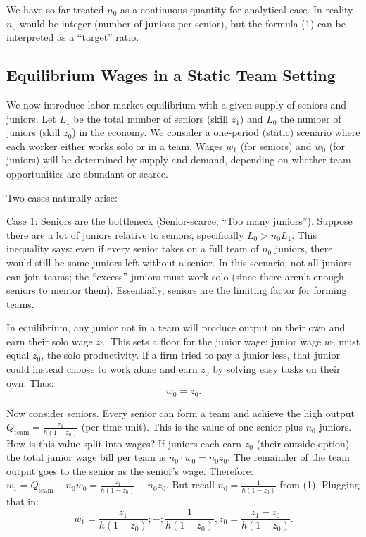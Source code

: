 \documentclass[12pt]{article}
\begin{document}
We have so far treated \(n_0\) as a continuous quantity for analytical
ease. In reality \(n_0\) would be integer (number of juniors per
senior), but the formula (1) can be interpreted as a ``target'' ratio.

\subsection{Equilibrium Wages in a Static Team
Setting}\label{equilibrium-wages-in-a-static-team-setting}

We now introduce {labor market equilibrium} with a given supply
of seniors and juniors. Let \(L_1\) be the total number of seniors
(skill \(z_1\)) and \(L_0\) the number of juniors (skill \(z_0\)) in the
economy. We consider a one-period (static) scenario where each worker
either works solo or in a team. Wages \(w_1\) (for seniors) and \(w_0\)
(for juniors) will be determined by supply and demand, depending on
whether team opportunities are abundant or scarce.

Two cases naturally arise:

{Case 1: Seniors are the bottleneck (Senior-scarce, ``Too many
juniors'').} Suppose there are a lot of juniors relative to seniors,
specifically \(L_0 > n_0 L_1\). This inequality says: even if every
senior takes on a full team of \(n_0\) juniors, there would still be
some juniors left without a senior. In this scenario, {not all
juniors can join teams}; the ``excess'' juniors must work solo (since
there aren't enough seniors to mentor them). Essentially, seniors are
the limiting factor for forming teams.

In equilibrium, any junior {not} in a team will produce output on
their own and earn their solo wage \(z_0\). This sets a floor for the
junior wage: {junior wage \(w_0\) must equal \(z_0\)}, the solo
productivity. If a firm tried to pay a junior less, that junior could
instead choose to work alone and earn \(z_0\) by solving easy tasks on
their own. Thus: 
\begin{equation}
    w_0 = z_0. \tag{3}
\end{equation}

Now consider seniors. Every senior can form a team and achieve the
high output \(Q_{\text{team}} = \frac{z_1}{h(1-z_0)}\) (per time
unit). This is the {value of one senior plus \(n_0\) juniors}.
How is this value split into wages? If juniors each earn \(z_0\)
(their outside option), the total junior wage bill per team is
\(n_0 \cdot w_0 = n_0 z_0\). The remainder of the team output goes to
the senior as the senior's wage. Therefore:
\(w_1 = Q_{\text{team}} - n_0 w_0 = \frac{z_1}{h(1-z_0)} - n_0 z_0.\)
But recall \(n_0 = \frac{1}{h(1-z_0)}\) from (1). Plugging that in: 
\begin{equation}
w_1  =  \frac{z_1}{h(1-z_0)} ;-; \frac{1}{h(1-z_0)} ,z_0  = 
\frac{z_1 - z_0}{h(1-z_0)}. \tag{4}
\end{equation}
\end{document}
